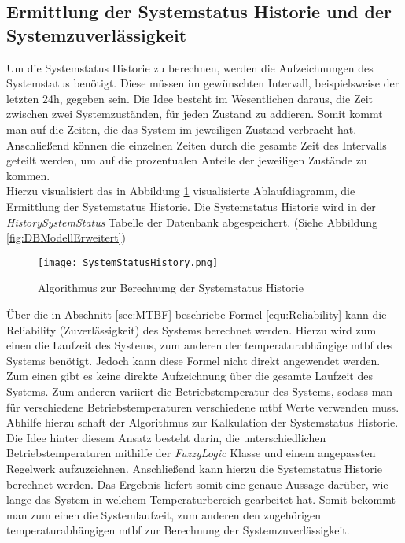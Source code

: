 \subsection{Ermittlung der Systemstatus Historie und der Systemzuverlässigkeit}\label{sec:SystemHistoryReliability}
Um die Systemstatus Historie zu berechnen, werden die Aufzeichnungen des Systemstatus benötigt. Diese müssen im gewünschten Intervall, beispielsweise der letzten 24h, gegeben sein.
Die Idee besteht im Wesentlichen daraus, die Zeit zwischen zwei Systemzuständen, für jeden Zustand zu addieren. Somit kommt man auf die Zeiten, die das System im jeweiligen Zustand verbracht hat. Anschließend können die einzelnen Zeiten durch die gesamte Zeit des Intervalls geteilt werden, um auf die prozentualen Anteile der jeweiligen Zustände zu kommen.\\
Hierzu visualisiert das in Abbildung \ref{fig:SystemStatusHistoryAlgorythmus} visualisierte Ablaufdiagramm, die Ermittlung der Systemstatus Historie. Die Systemstatus Historie wird in der \textit{HistorySystemStatus} Tabelle der Datenbank abgespeichert. (Siehe Abbildung \ref{fig:DBModellErweitert})
\begin{center}
    \begin{figure}[h!]
        \captionsetup{justification=centering,format=plain, font=small}
        \centering
        \texttt{[image: SystemStatusHistory.png]}
        \caption{Algorithmus zur Berechnung der Systemstatus Historie}
        \label{fig:SystemStatusHistoryAlgorythmus}
    \end{figure}
\end{center}
\vspace{-1cm}
Über die in Abschnitt \ref{sec:MTBF} beschriebe Formel \ref{equ:Reliability} kann die  Reliability (Zuverlässigkeit) des Systems berechnet werden. Hierzu wird zum einen die Laufzeit des Systems, zum anderen der temperaturabhängige \ac{mtbf} des Systems benötigt. Jedoch kann diese Formel nicht direkt angewendet werden. Zum einen gibt es keine direkte Aufzeichnung über die gesamte Laufzeit des Systems. Zum anderen variiert die Betriebstemperatur des Systems, sodass man für verschiedene Betriebstemperaturen verschiedene \ac{mtbf} Werte verwenden muss.\\
Abhilfe hierzu schaft der Algorithmus zur Kalkulation der Systemstatus Historie. Die Idee hinter diesem Ansatz besteht darin, die unterschiedlichen Betriebstemperaturen mithilfe der \textit{FuzzyLogic} Klasse und einem angepassten Regelwerk aufzuzeichnen. Anschließend kann hierzu die Systemstatus Historie berechnet werden. Das Ergebnis liefert somit eine genaue Aussage darüber, wie lange das System in welchem Temperaturbereich gearbeitet hat. Somit bekommt man zum einen die Systemlaufzeit, zum anderen den zugehörigen temperaturabhängigen \ac{mtbf} zur Berechnung der Systemzuverlässigkeit.\\ 
